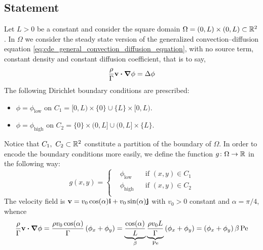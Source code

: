 
\subsection{Statement}

Let $L > 0$ be a constant and consider the square domain $\Omega = (0,L) \times
(0,L) \subset \mathbb{R}^2$. In $\Omega$ we consider the steady state version of the
generalized convection--diffusion equation
\eqref{eq:cde_general_convection_diffusion_equation}, with no source term,
constant density and constant diffusion coefficient, that is to say,
\begin{equation} \label{eq:diagcase_statement_pde1}
	\frac{\rho}{\Gamma} \vb{v} \vdot \grad{\phi} = \Delta{\phi}
\end{equation}
The following Dirichlet boundary conditions are prescribed:
\begin{itemize}[topsep=0pt]
	\item $\phi = \phi_\text{low}$ on $C_1 = [0,L) \times \{ 0 \} \cup \{ L \}
	\times [0,L)$.
	\item $\phi = \phi_\text{high}$ on $C_2 = \{ 0 \} \times (0,L] \cup (0,L]
	\times \{ L \}$.
\end{itemize}
Notice that $C_1, \ C_2 \subset \mathbb{R}^2$ constitute a partition of the boundary
of $\Omega$. In order to encode the boundary conditions more easily, we define
the function $g \colon \Omega \rightarrow \mathbb{R}$ in the following way:
\begin{equation}
	g(x,y) =
	\left\{
	\begin{aligned}
		&\phi_\text{low} 	& &\text{if } (x,y) \in C_1 \\
		&\phi_\text{high} 	& &\text{if } (x,y) \in C_2 \\
	\end{aligned}
	\right.
\end{equation}
The velocity field is $\vb{v} = v_0 \cos(\alpha) \vb{i} + v_0 \sin(\alpha)
\vb{j}$ with $v_0 > 0$ constant and $\alpha = \pi / 4$, whence
\begin{align}
	\frac{\rho}{\Gamma} \vb{v} \vdot \grad{\phi} = 
	\frac{\rho v_0 \cos(\alpha)}{\Gamma} \left( \phi_x + \phi_y \right) = 
	\underbrace{\frac{\cos(\alpha)}{L}}_{\beta} 
	\underbrace{\frac{\rho v_0 L}{\Gamma}}_{\peclet} \left( \phi_x + \phi_y \right) = 
	\left( \phi_x + \phi_y \right) \beta \, \peclet 
\end{align}
